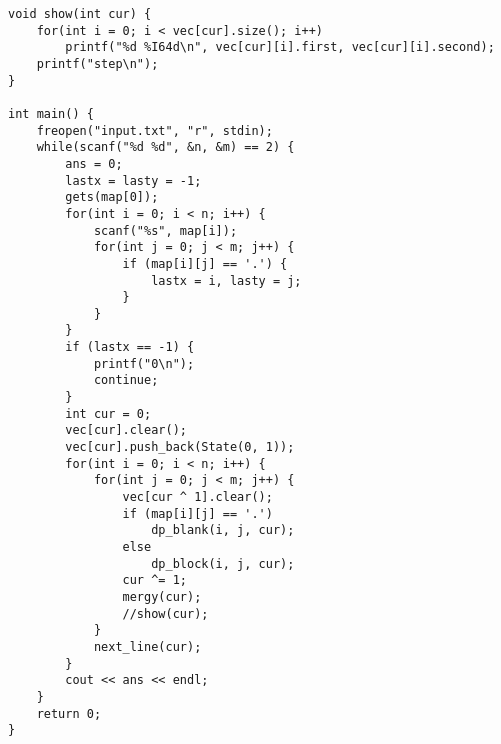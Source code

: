 \begin{lstlisting}
void show(int cur) {
	for(int i = 0; i < vec[cur].size(); i++)
		printf("%d %I64d\n", vec[cur][i].first, vec[cur][i].second);
	printf("step\n");
}

int main() {
	freopen("input.txt", "r", stdin);
	while(scanf("%d %d", &n, &m) == 2) {
		ans = 0;
		lastx = lasty = -1;
		gets(map[0]);
		for(int i = 0; i < n; i++) {
			scanf("%s", map[i]);
			for(int j = 0; j < m; j++) {
				if (map[i][j] == '.') {
					lastx = i, lasty = j;
				}
			}
		}
		if (lastx == -1) {
			printf("0\n");
			continue;
		}
		int cur = 0;
		vec[cur].clear();
		vec[cur].push_back(State(0, 1));
		for(int i = 0; i < n; i++) {
			for(int j = 0; j < m; j++) {
				vec[cur ^ 1].clear();
				if (map[i][j] == '.') 
					dp_blank(i, j, cur);
				else
					dp_block(i, j, cur);
				cur ^= 1;
				mergy(cur);
				//show(cur);
			}
			next_line(cur);
		}
		cout << ans << endl;
	}
	return 0;
}
	\end{lstlisting}
